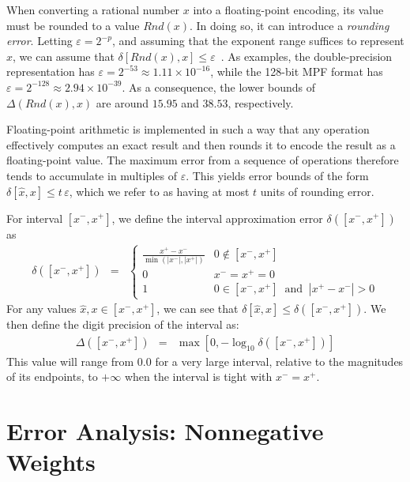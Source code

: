 \documentclass[letterpaper,USenglish,cleveref, autoref, thm-restate]{lipics-v2021}
\newcommand{\approximate}[1]{\hat{#1}}
\newcommand{\approxx}{\approximate{x}}
\newcommand{\round}{\mathit{Rnd}}
\newcommand{\aerror}{\delta}
\newcommand{\digitprecision}{\Delta}
\newcommand{\roundepsilon}{\varepsilon}
\newcommand{\xmin}{x^{-}}
\newcommand{\xmax}{x^{+}}
\begin{document}
When converting a rational number $x$ into a floating-point encoding, its value must be rounded to a
value $\round(x)$.  In doing so, it can introduce a \emph{rounding
error}.  
Letting $\roundepsilon = 2^{-p}$, and assuming that
the exponent range suffices to represent $x$,
we can assume that
$\aerror[\round(x), x] \leq \roundepsilon$~\cite{muller:hfpa:2018,knuth:fp:1981}.
As examples, the double-precision representation has $\roundepsilon = 2^{-53} \approx 1.11 \times 10^{-16}$, while the 128-bit MPF format
has $\roundepsilon = 2^{-128} \approx 2.94 \times 10^{-39}$.  As a consequence, the lower bounds of $\digitprecision(\round(x), x)$ are around $15.95$ and $38.53$, respectively.

Floating-point arithmetic is implemented in such a way that any
operation effectively computes an exact result and then rounds it to
encode the result as a floating-point value.  The maximum error from a sequence of operations
therefore tends to accumulate in multiples of $\roundepsilon$.
This yields error bounds of the form $\aerror[\approxx, x] \leq t\,\roundepsilon$,
which we  refer to as having at most $t$ units of
rounding error.

For interval $[\xmin, \xmax]$, we define the interval approximation error $\aerror([\xmin, \xmax])$ as
\begin{eqnarray}
\aerror([\xmin, \xmax]) & = & \left\{ \begin{array}{ll}
  \frac{\xmax - \xmin}{\min(|\xmin|, |\xmax|)}  & 0 \not \in [\xmin, \xmax]\\[0.8em]
  0 & \xmin = \xmax = 0 \\
  1 & 0 \in [\xmin, \xmax] \;\; \textrm{and} \;\; |\xmax - \xmin|  > 0 
  \end{array} \right. \label{eqn:interval:error}
\end{eqnarray}
For any values $\approxx, x \in [\xmin, \xmax]$, we can see that
$\aerror[\approxx, x] \leq \aerror([\xmin, \xmax])$.
We then define the digit precision of the interval as:
\begin{eqnarray}
\digitprecision([\xmin, \xmax]) & = & \max[0, -\log_{10} \aerror([\xmin, \xmax])] \label{eqn:interval:digitprecision} 
\end{eqnarray}
This value will range from $0.0$ for a very large interval, relative to the magnitudes of its endpoints, to $+\infty$ when the interval is tight with $\xmin = \xmax$.

\section{Error Analysis: Nonnegative Weights}
\label{sect:nonneg}
\end{document}
